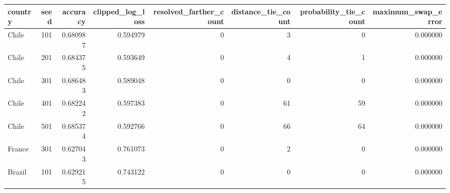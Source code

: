 \begin{tabular}{lrrrrrrr}
\toprule
country & seed & accuracy & clipped_log_loss & resolved_farther_count & distance_tie_count & probability_tie_count & maximum_swap_error \\
\midrule
Chile & 101 & 0.680987 & 0.594979 & 0 & 3 & 0 & 0.000000 \\
Chile & 201 & 0.684375 & 0.593649 & 0 & 4 & 1 & 0.000000 \\
Chile & 301 & 0.686483 & 0.589048 & 0 & 0 & 0 & 0.000000 \\
Chile & 401 & 0.682242 & 0.597383 & 0 & 61 & 59 & 0.000000 \\
Chile & 501 & 0.685374 & 0.592766 & 0 & 66 & 64 & 0.000000 \\
France & 301 & 0.627043 & 0.761073 & 0 & 2 & 0 & 0.000000 \\
Brazil & 101 & 0.629215 & 0.743122 & 0 & 0 & 0 & 0.000000 \\
\bottomrule
\end{tabular}
